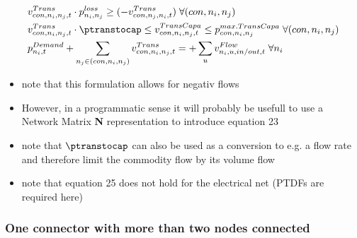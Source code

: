	\begin{figure}[h!]
		\centering
		
		\caption{}
		\label{}
	\end{figure}

\begin{align} \label{eq:transcons}
	&\vTrans \cdot \ptransloss \geq (-\vTrans[con,\node_j,\node_i,t]) \; \forall (con,n_i,n_j) \\%
	&\vTrans \cdot \ptranstocap
 \leq \vTranCapa \leq \pMaxTransCapa  \; \forall (con,n_i,n_j) \\
	&\pDemand[\node_i,t] + \sum_{n_j \in (con,n_i,n_j)} \vTrans  = + \sum_{u} \vFlow [\node_i,u,in/out,t]  \; \forall \node_{i}
\end{align}
\begin{itemize}
	\item note that this formulation allows for negativ flows
	\item However, in a programmatic sense it will probably be usefull to use a Network Matrix \textbf{N} representation to introduce equation 23
	\item note that $\ptranstocap$ can also be used as a conversion to e.g. a flow rate and therefore limit the commodity flow by its volume flow
	\item note that equation 25 does not hold for the electrical net (PTDFs are required here)
\end{itemize}
\subsubsection{One connector with more than two nodes connected}
\begin{figure}[h!]
			\centering
	
	\label{}
\end{figure}


